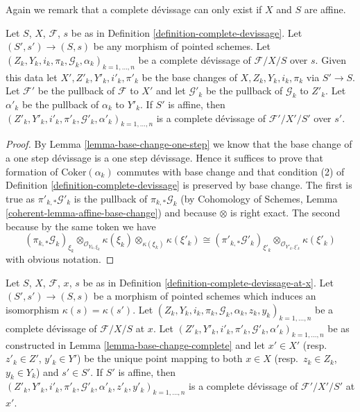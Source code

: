 \noindent
Again we remark that a complete d\'evissage can only exist if $X$ and
$S$ are affine.

\begin{lemma}
\label{lemma-base-change-complete}
Let $S$, $X$, $\mathcal{F}$, $s$ be as in
Definition \ref{definition-complete-devissage}.
Let $(S', s') \to (S, s)$ be any morphism of pointed schemes.
Let $(Z_k, Y_k, i_k, \pi_k, \mathcal{G}_k, \alpha_k)_{k = 1, \ldots, n}$
be a complete d\'evissage of $\mathcal{F}/X/S$ over $s$.
Given this data let $X', Z'_k, Y'_k, i'_k, \pi'_k$ be the base
changes of $X, Z_k, Y_k, i_k, \pi_k$ via $S' \to S$.
Let $\mathcal{F}'$ be the pullback of $\mathcal{F}$ to $X'$
and let $\mathcal{G}'_k$ be the pullback of $\mathcal{G}_k$ to $Z'_k$.
Let $\alpha'_k$ be the pullback of $\alpha_k$ to $Y'_k$.
If $S'$ is affine, then
$(Z'_k, Y'_k, i'_k, \pi'_k, \mathcal{G}'_k, \alpha'_k)_{k = 1, \ldots, n}$
is a complete d\'evissage of $\mathcal{F}'/X'/S'$ over $s'$.
\end{lemma}

\begin{proof}
By
Lemma \ref{lemma-base-change-one-step}
we know that the base change of a one step d\'evissage is a one step
d\'evissage. Hence it suffices to prove that formation of
$\text{Coker}(\alpha_k)$ commutes with base change and that
condition (2) of
Definition \ref{definition-complete-devissage}
is preserved by base change. The first is true as
$\pi'_{k, *}\mathcal{G}'_k$ is the pullback of
$\pi_{k, *}\mathcal{G}_k$ (by
Cohomology of Schemes, Lemma \ref{coherent-lemma-affine-base-change})
and because $\otimes$ is right exact. The second because
by the same token we have
$$
(\pi_{k, *}\mathcal{G}_k)_{\xi_k}
\otimes_{\mathcal{O}_{Y_k, \xi_k}} \kappa(\xi_k)
\otimes_{\kappa(\xi_k)} \kappa(\xi'_k)
\cong
(\pi'_{k, *}\mathcal{G}'_k)_{\xi'_k}
\otimes_{\mathcal{O}_{Y'_k, \xi'_k}} \kappa(\xi'_k)
$$
with obvious notation.
\end{proof}

\begin{lemma}
\label{lemma-base-change-complete-at-x}
Let $S$, $X$, $\mathcal{F}$, $x$, $s$ be as in
Definition \ref{definition-complete-devissage-at-x}.
Let $(S', s') \to (S, s)$ be a morphism of pointed schemes
which induces an isomorphism $\kappa(s) = \kappa(s')$. Let
$(Z_k, Y_k, i_k, \pi_k, \mathcal{G}_k, \alpha_k, z_k, y_k)_{k = 1, \ldots, n}$
be a complete d\'evissage of $\mathcal{F}/X/S$ at $x$.
Let
$(Z'_k, Y'_k, i'_k, \pi'_k, \mathcal{G}'_k, \alpha'_k)_{k = 1, \ldots, n}$
be as constructed in
Lemma \ref{lemma-base-change-complete}
and let $x' \in X'$ (resp.\ $z'_k \in Z'$, $y'_k \in Y'$) be the
unique point mapping to both $x \in X$ (resp.\ $z_k \in Z_k$, $y_k \in Y_k$)
and $s' \in S'$.
If $S'$ is affine, then
$(Z'_k, Y'_k, i'_k, \pi'_k, \mathcal{G}'_k, \alpha'_k,
z'_k, y'_k)_{k = 1, \ldots, n}$
is a complete d\'evissage of $\mathcal{F}'/X'/S'$ at $x'$.
\end{lemma}

